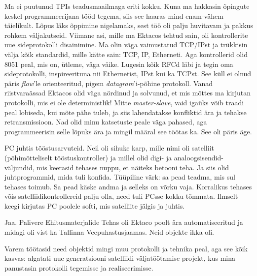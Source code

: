 Ma ei puutunud TPIs teadusmaailmaga eriti kokku. Kuna ma hakkasin õpingute keskel programmeerijana tööd tegema, siis see haaras mind  
enam-vähem täielikult. Lõpus läks õppimine 
nigelamaks, sest töö oli palju huvitavam ja pakkus rohkem väljakutseid. Viimane asi, mille ma Ektacos tehtud sain, oli 
kontrollerite uue sideprotokolli disainimine. Ma olin väga vaimustatud 
TCP/IPst ja trükkisin välja kõik standardid, mille kätte sain: TCP, IP, 
Etherneti. Aga kontrollerid olid 8051 peal, mis on, ütleme, väga 
väike. Lugesin kõik RFCd läbi ja tegin oma 
sideprotokolli, inspireerituna nii Ethernetist, IPst kui ka TCPst. See küll
ei olnud päris \emph{flow}'le orienteeritud, pigem 
\emph{datagram}'i-põhine protokoll. Vanad riistvaraässad Ektacos olid 
väga nördinud ja solvunud, et mis mõttes ma kirjutan protokolli, mis ei ole 
deterministlik! Mitte \emph{master-slave}, vaid igaüks võib traadi peal 
lobiseda, kui mõte pähe tuleb, ja siis lahendatakse konfliktid ära ja tehakse 
retransmissioon. Nad olid minu katsetuste peale väga pahased, aga 
programmeerisin selle lõpuks ära ja mingil määral see töötas ka. See oli 
päris äge.


PC juhtis tööstusarvuteid. Neil oli sihuke karp, mille nimi oli satelliit (põhimõtteliselt tööstuskontroller) ja millel 
olid digi- ja analoogsisendid-väljundid, mis keerasid tehases 
nuppu, et näiteks betooni teha. Ja siis olid 
juhtprogrammid, mida tuli konfida. Tüüpiline värk: sa pead teadma, mis 
sul tehases toimub. Sa pead käske andma ja selleks on võrku vaja. Korralikus tehases võis
satelliidikontrollereid palju olla, need tuli PCsse kokku tõmmata. Ilmselt keegi kirjutas PC poolele softi, mis satelliite jälgis ja juhtis.


Jaa. Palivere Ehitusmaterjalide Tehas oli Ektaco poolt ära automatiseeritud ja midagi oli vist ka Tallinna 
Veepuhastusjaamas. Neid objekte ikka oli.

Varem töötasid need objektid mingi muu protokolli ja tehnika peal, aga see kõik kasvas: algatati uue generatsiooni satelliidi väljatöötamise projekt, 
kus mina panustasin protokolli tegemisse ja realiseerimisse. 



